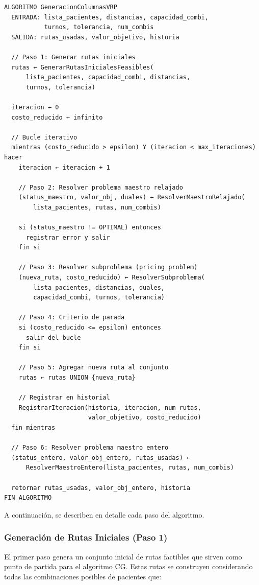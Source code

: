 \documentclass[12pt]{article}
\begin{document}
\begin{Verbatim}[fontsize=\small]
ALGORITMO GeneracionColumnasVRP
  ENTRADA: lista_pacientes, distancias, capacidad_combi, 
           turnos, tolerancia, num_combis
  SALIDA: rutas_usadas, valor_objetivo, historia

  // Paso 1: Generar rutas iniciales
  rutas ← GenerarRutasInicialesFeasibles(
      lista_pacientes, capacidad_combi, distancias, 
      turnos, tolerancia)
  
  iteracion ← 0
  costo_reducido ← infinito

  // Bucle iterativo
  mientras (costo_reducido > epsilon) Y (iteracion < max_iteraciones) hacer
    iteracion ← iteracion + 1
    
    // Paso 2: Resolver problema maestro relajado
    (status_maestro, valor_obj, duales) ← ResolverMaestroRelajado(
        lista_pacientes, rutas, num_combis)
    
    si (status_maestro != OPTIMAL) entonces
      registrar error y salir
    fin si

    // Paso 3: Resolver subproblema (pricing problem)
    (nueva_ruta, costo_reducido) ← ResolverSubproblema(
        lista_pacientes, distancias, duales, 
        capacidad_combi, turnos, tolerancia)
    
    // Paso 4: Criterio de parada
    si (costo_reducido <= epsilon) entonces
      salir del bucle
    fin si

    // Paso 5: Agregar nueva ruta al conjunto
    rutas ← rutas UNION {nueva_ruta}
    
    // Registrar en historial
    RegistrarIteracion(historia, iteracion, num_rutas, 
                       valor_objetivo, costo_reducido)
  fin mientras

  // Paso 6: Resolver problema maestro entero
  (status_entero, valor_obj_entero, rutas_usadas) ← 
      ResolverMaestroEntero(lista_pacientes, rutas, num_combis)

  retornar rutas_usadas, valor_obj_entero, historia
FIN ALGORITMO
\end{Verbatim}

A continuación, se describen en detalle cada paso del algoritmo.

\subsubsection{Generación de Rutas Iniciales (Paso 1)}

El primer paso genera un conjunto inicial de rutas factibles que sirven como punto de partida para el algoritmo CG. Estas rutas se construyen considerando todas las combinaciones posibles de pacientes que:
\end{document}
